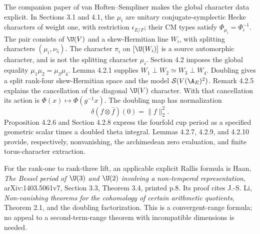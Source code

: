 \documentclass[11pt]{article}
\theoremstyle{definition}\newtheorem{definition}[theorem]{Definition}\newtheorem{remark}[theorem]{Remark}
\begin{document}
The companion paper of van Hoften--Sempliner makes the global character
data explicit. In Sections 3.1 and 4.1, the $\mu_i$ are unitary
conjugate-symplectic Hecke characters of weight one, with restriction
$\epsilon_{E/F}$; their CM types satisfy
$\Phi_{\mu_i}=\Phi_i^{-1}$. The pair consists of $\U(V)$ and a
skew-Hermitian line $W_i$, with splitting characters $(\mu_i,\nu_5)$.
The character $\pi_i$ on $[\U(W_i)]$ is a source automorphic character,
and is not the splitting character $\mu_i$. Section 4.2 imposes the
global equality $\mu_1\mu_2=\mu_3\mu_4$. Lemma 4.2.1 supplies
$W_1\perp W_2\simeq W_3\perp W_4$. Doubling gives a split rank-four
skew-Hermitian space and the model $\mathcal S(V(\A_E)^2)$.
Remark 4.2.5 explains the cancellation of the diagonal $\U(V)$ character.
With that cancellation its action is $\Phi(x)\mapsto\Phi(g^{-1}x)$.
The doubling map has normalization
\[
 \delta(f\otimes\bar f)(0)=\|f\|_2^2.
\]
Proposition 4.2.6 and Section 4.2.8 express the fourfold cup period as a
specified geometric scalar times a doubled theta integral. Lemmas
4.2.7, 4.2.9, and 4.2.10 provide, respectively, nonvanishing, the
archimedean zero evaluation, and finite torus-character extraction.

For the rank-one to rank-three lift, an applicable explicit Rallis
formula is Haan, \emph{The Bessel period of $\U(3)$ and $\U(2)$ involving
a non-tempered representation}, arXiv:1403.5061v7, Section 3.3,
Theorem 3.4, printed p.8. Its proof cites J.-S. Li, \emph{Non-vanishing
theorems for the cohomology of certain arithmetic quotients}, Theorem
2.1, and the doubling factorization. This is a convergent-range
formula; no appeal to a second-term-range theorem with incompatible
dimensions is needed.
\end{document}
